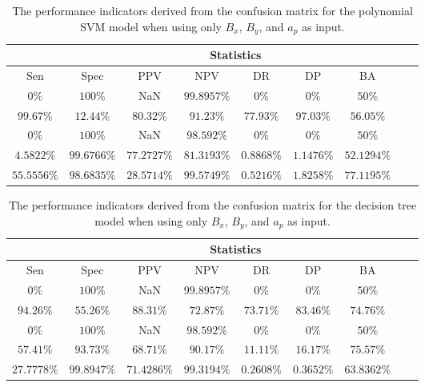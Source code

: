 \begin{table}[!ht]
	\centering
	\begin{tabular}{|c|c|c|c|c|c|c|c|c|}
		\hline
		 & \multicolumn{7}{c|}{Statistics} \\ \hline
		Sen & Spec & PPV & NPV & DR & DP & BA \\ \hline
		$0\%$ & $100\%$ & NaN & $99.8957\%$ & $0\%$ & $0\%$ & $50\%$ \\ \hline
		$99.67\%$ & $12.44\%$ & $80.32\%$ & $91.23\%$ & $77.93\%$ & $97.03\%$ & $56.05\%$ \\ \hline
		$0\%$ & $100\%$ & NaN & $98.592\%$ & $0\%$ & $0\%$ & $50\%$ \\ \hline
		$4.5822\%$ & $99.6766\%$ & $77.2727\%$ & $81.3193\%$ & $0.8868\%$ & $1.1476\%$ & $52.1294\%$ \\ \hline
		$55.5556\%$ & $98.6835\%$ & $28.5714\%$ & $99.5749\%$ & $0.5216\%$ & $1.8258\%$ & $77.1195\%$ \\ \hline
	\end{tabular}
	\caption{The performance indicators derived from the confusion matrix for the polynomial SVM model when using only $B_{x}$, $B_{y}$, and $a_{p}$ as input.}
	\label{tab:cs:xyap:svmPoly}
\end{table}

\begin{table}[!ht]
	\centering
	\begin{tabular}{|c|c|c|c|c|c|c|c|c|}
		\hline
		 & \multicolumn{7}{c|}{Statistics} \\ \hline
		Sen & Spec & PPV & NPV & DR & DP & BA \\ \hline
		$0\%$ & $100\%$ & NaN & $99.8957\%$ & $0\%$ & $0\%$ & $50\%$ \\ \hline
		$94.26\%$ & $55.26\%$ & $88.31\%$ & $72.87\%$ & $73.71\%$ & $83.46\%$ & $74.76\%$ \\ \hline
		$0\%$ & $100\%$ & NaN & $98.592\%$ & $0\%$ & $0\%$ & $50\%$ \\ \hline
		$57.41\%$ & $93.73\%$ & $68.71\%$ & $90.17\%$ & $11.11\%$ & $16.17\%$ & $75.57\%$ \\ \hline
		$27.7778\%$ & $99.8947\%$ & $71.4286\%$ & $99.3194\%$ & $0.2608\%$ & $0.3652\%$ & $63.8362\%$ \\ \hline
	\end{tabular}
	\caption{The performance indicators derived from the confusion matrix for the decision tree model when using only $B_{x}$, $B_{y}$, and $a_{p}$ as input.}
	\label{tab:cs:xyap:C5.0}
\end{table}

